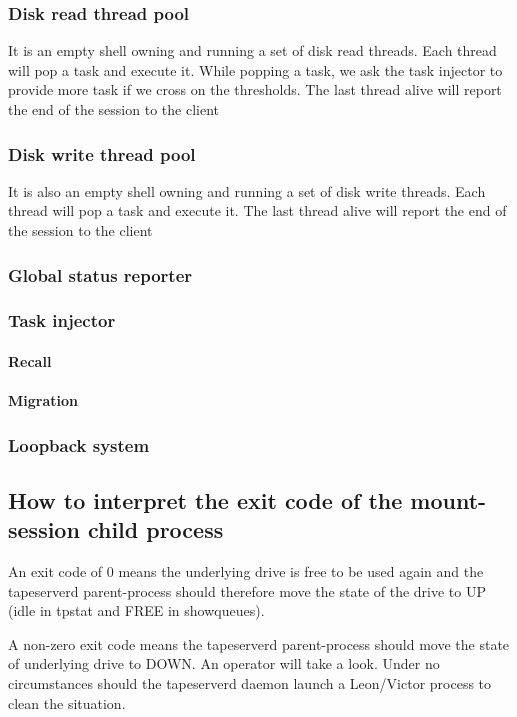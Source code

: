 \subsubsection{Disk read thread pool}
It is an empty shell owning and running a set of disk read threads. Each thread will pop a task and execute it.
While popping a task, we ask the task injector to provide more task if we cross on the thresholds.
The last thread alive will report the end of the session to the client 
\subsubsection{Disk write thread pool}
It is also an empty shell owning and running a set of disk write threads. Each thread will pop a task and execute it.
The last thread alive will report the end of the session to the client 
\subsubsection{Global status reporter}

\subsubsection{Task injector}
\paragraph{Recall}
\paragraph{Migration}
\subsubsection{Loopback system}

\subsection{How to interpret the exit code of the mount-session child process}
An exit code of 0 means the underlying drive is free to be used again and the tapeserverd parent-process should therefore move the state of the drive to UP (idle in tpstat and FREE in showqueues).

A non-zero exit code means the tapeserverd parent-process should move the state of underlying drive to DOWN.  An operator will take a look. Under no circumstances should the tapeserverd daemon launch a Leon/Victor process to clean the situation.

